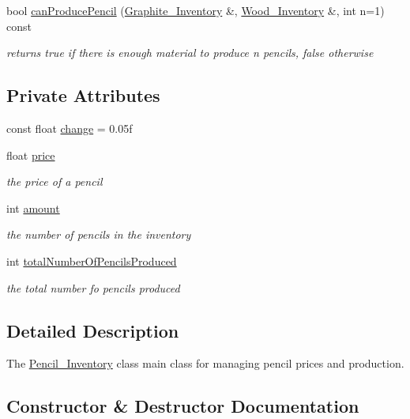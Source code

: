 \begin{DoxyCompactItemize}
bool \hyperlink{classPencil__Inventory_a9026f7bf1a45e41aebea2e39f6edfdff}{can\+Produce\+Pencil} (\hyperlink{classGraphite__Inventory}{Graphite\+\_\+\+Inventory} \&, \hyperlink{classWood__Inventory}{Wood\+\_\+\+Inventory} \&, int n=1) const
\begin{DoxyCompactList}\small\item\em returns true if there is enough material to produce n pencils, false otherwise \end{DoxyCompactList}\end{DoxyCompactItemize}
\subsection*{Private Attributes}
\begin{DoxyCompactItemize}
\item 
const float \hyperlink{classPencil__Inventory_a063e85195a84875c4b3f42c2f01ebdbd}{change} = 0.\+05f
\item 
float \hyperlink{classPencil__Inventory_a833632ab57afc00b148d106c43a6729e}{price}
\begin{DoxyCompactList}\small\item\em the price of a pencil \end{DoxyCompactList}\item 
int \hyperlink{classPencil__Inventory_a19f4ff72e64dbd5c5fbb1fd302b54c85}{amount}
\begin{DoxyCompactList}\small\item\em the number of pencils in the inventory \end{DoxyCompactList}\item 
int \hyperlink{classPencil__Inventory_ac7f37f56e5e1a630cf24e436aac27cee}{total\+Number\+Of\+Pencils\+Produced}
\begin{DoxyCompactList}\small\item\em the total number fo pencils produced \end{DoxyCompactList}\end{DoxyCompactItemize}


\subsection{Detailed Description}
The \hyperlink{classPencil__Inventory}{Pencil\+\_\+\+Inventory} class main class for managing pencil prices and production. 

\subsection{Constructor \& Destructor Documentation}
\mbox{\label{classPencil__Inventory_a68480c5a7aa85cee3cb19619115ad552}} 
